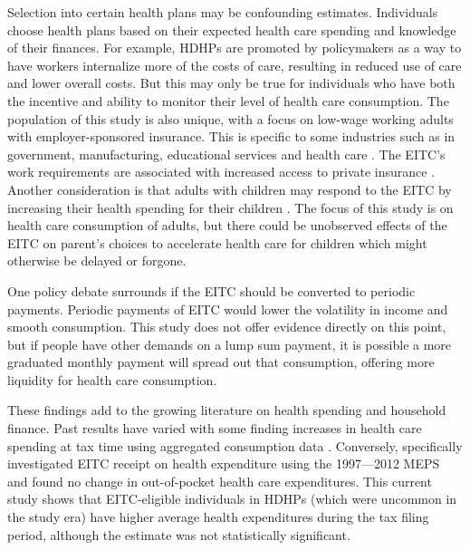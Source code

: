 \documentclass[smallcondensed,referee]{svjour3}
\begin{document}
Selection into certain health plans may be confounding estimates. Individuals choose health plans based on their expected health care spending and knowledge of their finances. For example, HDHPs are promoted by policymakers as a way to have workers internalize more of the costs of care, resulting in reduced use of care and lower overall costs. But this may only be true for individuals who have both the incentive and ability to monitor their level of health care consumption.   The population of this study is also unique, with a focus on low-wage working adults with employer-sponsored insurance. This is specific to some industries such as in government, manufacturing, educational services and health care \citep{fronstin_how_2020}.  The EITC's work requirements are associated with increased access to private insurance \citep{lenhart_effects_2019,hoynes_income_2015,baughman_evaluating_2005}.  Another consideration is that adults with children may respond to the EITC by increasing their health spending for their children \citep{monheit_how_2020}. The focus of this study is on  health care consumption of adults, but there could be unobserved effects of the EITC on parent's choices to accelerate health care for children which might otherwise be delayed or forgone. 

One policy debate surrounds if the EITC should be converted to periodic payments.  Periodic payments of EITC would lower the volatility in income and smooth consumption.   This study does not offer evidence directly on this point, but if people have other demands on a lump sum payment, it is possible a more graduated monthly payment will spread out that consumption, offering more liquidity for health care consumption.

These findings add to the growing literature on health spending and household finance. Past results have varied with some finding increases in health care spending at tax time using aggregated consumption data \citep{parker_consumer_2013, johnson_household_2006, farrell_coping_2017}. Conversely, \cite{hamad_short-term_2019} specifically investigated EITC receipt on health expenditure using the 1997---2012 MEPS and found no change in out-of-pocket health care expenditures. This current study shows that EITC-eligible individuals in HDHPs (which were uncommon in the \cite{hamad_short-term_2019} study era) have higher average health expenditures during the tax filing period, although the estimate was not statistically significant. 
\end{document}
